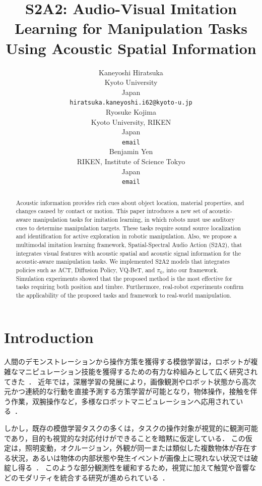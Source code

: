 \documentclass{article}
\title{S2A2: Audio-Visual Imitation Learning for Manipulation Tasks Using Acoustic Spatial Information}
\author{
  Kaneyoshi Hiratsuka\\
  Kyoto University \\
  Japan\\
  \texttt{hiratsuka.kaneyoshi.i62@kyoto-u.jp} \\
  \And
  Ryosuke Kojima \\
  Kyoto University, RIKEN \\
  Japan \\
  \texttt{email} \\
  \AND
  Benjamin Yen \\
  RIKEN, Institute of Science Tokyo \\
  Japan \\
  \texttt{email} \\
}
\begin{document}
\maketitle
\begin{abstract}

Acoustic information provides rich cues about object location, material properties, and changes caused by contact or motion.
This paper introduces a new set of acoustic-aware manipulation tasks for imitation learning, in which robots must use auditory cues to determine manipulation targets.
These tasks require sound source localization and identification for active exploration in robotic manipulation.
Also, we propose a multimodal imitation learning framework, Spatial-Spectral Audio Action (S2A2), that integrates visual features with acoustic spatial and acoustic signal information for the acoustic-aware manipulation tasks. 
We implemented S2A2 models that integrates policies such as ACT, Diffusion Policy, VQ-BeT, and $\pi_0$, into our framework. Simulation experiments showed that the proposed method is the most effective for tasks requiring both position and timbre.
Furthermore, real-robot experiments confirm the applicability of the proposed tasks and framework to real-world manipulation.

\end{abstract}
\section{Introduction}
人間のデモンストレーションから操作方策を獲得する模倣学習は，ロボットが複雑なマニピュレーション技能を獲得するための有力な枠組みとして広く研究されてきた~\citep{pomerleau1988alvinn,argall2009survey,osa2018algorithmic}．
近年では，深層学習の発展により，画像観測やロボット状態から高次元かつ連続的な行動を直接予測する方策学習が可能となり，物体操作，接触を伴う作業，双腕操作など，多様なロボットマニピュレーションへ応用されている~\citep{vla_survey2025}．

しかし，既存の模倣学習タスクの多くは，タスクの操作対象が視覚的に観測可能であり，目的も視覚的な対応付けができることを暗黙に仮定している．
この仮定は，照明変動，オクルージョン，外観が同一または類似した複数物体が存在する状況，あるいは物体の内部状態や発生イベントが画像上に現れない状況では破綻し得る~\citep{playitbyear}．
このような部分観測性を緩和するため，視覚に加えて触覚や音響などのモダリティを統合する研究が進められている~\citep{seehearfeel,vtt2022,sts_il2024,vitamin2024,tacthru2025,neuralfeels2024}．
\end{document}
